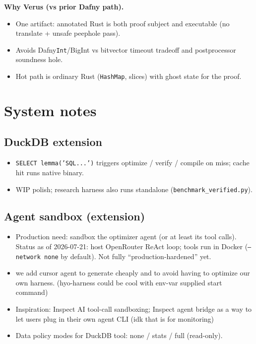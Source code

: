 \documentclass[sigconf, nonacm]{acmart}
\begin{document}
\noindent\textbf{Why Verus (vs prior Dafny path).}
\begin{itemize}
  \item One artifact: annotated Rust is both proof subject and executable (no translate + unsafe peephole pass).
  \item Avoids Dafny\texttt{Int}/BigInt vs bitvector timeout tradeoff and postprocessor soundness hole.
  \item Hot path is ordinary Rust (\texttt{HashMap}, slices) with ghost state for the proof.
\end{itemize}

\section{System notes}

\subsection{DuckDB extension}
\begin{itemize}
  \item \texttt{SELECT lemma('SQL...')} triggers optimize / verify / compile on miss; cache hit runs native binary.
  \item WIP polish; research harness also runs standalone (\texttt{benchmark\_verified.py}).
\end{itemize}

\subsection{Agent sandbox (extension)}
\begin{itemize}
  \item Production need: sandbox the optimizer agent (or at least its tool calls). Status as of 2026-07-21: host OpenRouter ReAct loop; tools run in Docker (\texttt{--network none} by default). Not fully ``production-hardened'' yet.
  \item we add cursor agent to generate cheaply and to avoid having to optimize our own harness. (hyo-harness could be cool with env-var supplied start command)
  \item Inspiration: Inspect AI tool-call sandboxing; Inspect agent bridge as a way to let users plug in their own agent CLI (idk that is for monitoring)
  \item Data policy modes for DuckDB tool: none / stats / full (read-only).
\end{itemize}
\end{document}
